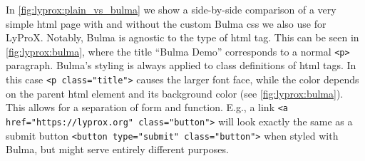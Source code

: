 \documentclass[\relativeRoot/main.tex]{subfiles}
\begin{document}
In \cref{fig:lyprox:plain_vs_bulma} we show a side-by-side comparison of a very simple \acrshort{html} page with and without the custom Bulma \gls{css} we also use for LyProX. Notably, Bulma is agnostic to the type of \acrshort{html} tag. This can be seen in \cref{fig:lyprox:bulma}, where the title ``Bulma Demo'' corresponds to a normal \texttt{<p>} paragraph. Bulma's styling is always applied to class definitions of \acrshort{html} tags. In this case \texttt{<p class="title">} causes the larger font face, while the color depends on the parent \acrshort{html} element and its background color (see \cref{fig:lyprox:bulma}). This allows for a separation of form and function. E.g., a link \texttt{<a href="https://lyprox.org" class="button">} will look exactly the same as a submit button \texttt{<button type="submit" class="button">} when styled with Bulma, but might serve entirely different purposes.
\end{document}
